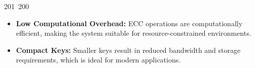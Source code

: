 201~200~\documentclass{article}
\begin{document}
\begin{itemize}
	                                                                                                                                                                                                                                                                                                	                                                                                                                                        	    	                                                                                                	                                                                                                                                                                                                                                                                                                                                	                                                                        	                                                                        	                                                                                                                                        	                                                                                                                                                                                \item \textbf{Low Computational Overhead:} ECC operations are computationally efficient, making the system suitable for resource-constrained environments.
	                                                                                                                                                                                                                                                                                                	                                                                                                                                        	    	                                                                                                	                                                                                                                                                                                                                                                                                                                                	                                                                        	                                                                        	                                                                                                                                        	                                                                                                                                                                                    \item \textbf{Compact Keys:} Smaller keys result in reduced bandwidth and storage requirements, which is ideal for modern applications.

\end{itemize}
\end{document}

